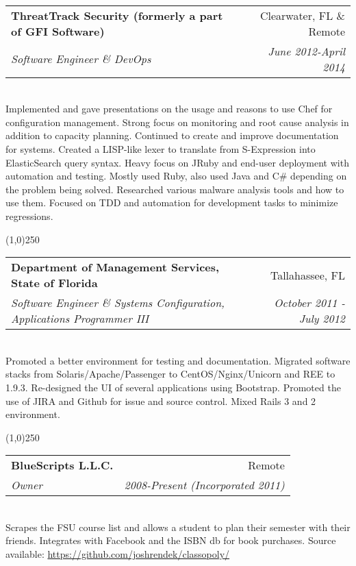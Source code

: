 \documentclass[a4paper,11pt,sans]{article}
\makeatletter
\newcommand{\ressubheading}[4]{
\begin{tabular*}{7.0in}{l@{\extracolsep{\fill}}r}
		\textbf{#1} & #2 \\
		\textit{#3} & \textit{#4} \\
\end{tabular*}\vspace{-6pt}}
\makeatother
\begin{document}
\hspace{5pt} \\

\ressubheading{ThreatTrack Security (formerly a part of GFI Software)}{Clearwater, FL \& Remote}{Software Engineer \& DevOps}{June 2012-April 2014}

\hspace{5pt} \\
Implemented and gave presentations on the usage and reasons to use Chef for configuration management. Strong focus on monitoring and root cause analysis in addition to capacity planning. Continued to create and improve documentation for systems. Created a
LISP-like lexer to translate from S-Expression into ElasticSearch query syntax. Heavy focus on JRuby and end-user deployment with automation and testing. Mostly used Ruby, also used Java and C\#
depending on the problem being solved. Researched various malware analysis tools and how to use them. Focused on TDD and automation for development tasks to minimize regressions.

\begin{center}
  \line(1,0){250}
\end{center}


\ressubheading{Department of Management Services, State of Florida}{Tallahassee, FL}{Software Engineer \& Systems Configuration, Applications Programmer III}{October 2011 - July 2012}

\hspace{5pt} \\

Promoted a better environment for testing and documentation. Migrated software stacks from Solaris/Apache/Passenger to CentOS/Nginx/Unicorn and REE to 1.9.3.
Re-designed the UI of several applications using Bootstrap. Promoted the use of JIRA and Github for issue and source control. Mixed Rails 3 and 2 environment.

\begin{center}
  \line(1,0){250}
\end{center}

\ressubheading{BlueScripts L.L.C.}{Remote}{Owner}{2008-Present (Incorporated 2011)}

\setlength{\parindent}{15pt}

\hspace{5pt} \\

Scrapes the FSU course list and allows a student to plan their semester with their friends. Integrates with Facebook and the ISBN db for book purchases.
Source available: \url{https://github.com/joshrendek/classopoly/}
\end{document}
